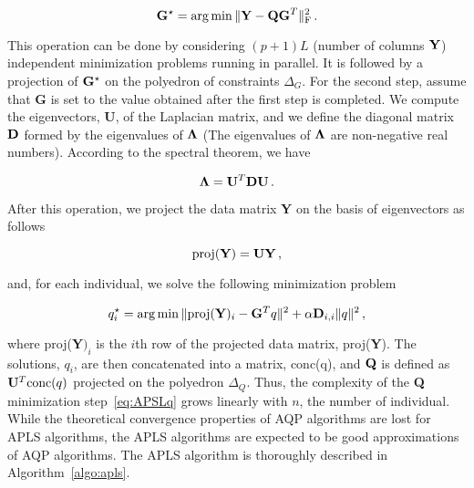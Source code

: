 \begin{equation}
{\bf G}^\star = \arg \min  \|  {\bf Y} - {\bf QG}^T \|^2_{\rm F} \, .
\end{equation}

This operation can be done by considering $(p+1)L$ (number of columns ${\bf Y}$) independent minimization problems running in parallel. It is followed by a projection of ${\bf G}^\star$ on the polyedron of constraints $\Delta_G$. For the second step, assume that {\bf G} is set to the value obtained after the first step is completed. We compute the eigenvectors, {\bf U}, of the Laplacian matrix, and we define the diagonal matrix ${\bf D}$ formed by the eigenvalues of ${\bf \Lambda}$ (The eigenvalues of ${\bf \Lambda}$ are non-negative real numbers). According to the spectral theorem, we have

$$
{\bf \Lambda} = {\bf U}^T {\bf D} {\bf U} \, .
$$

\noindent  After this operation, we project the data matrix {\bf Y} on the basis of eigenvectors as follows

$$
{\rm proj} ({\bf Y}) = {\bf U}{\bf Y} \, , 
$$

\noindent and, for each individual, we solve the following minimization problem

\begin{equation}
q_i^\star = \arg \min  \|  {\rm proj} ({\bf Y})_i  - {\bf G}^Tq \|^2 + \alpha {\bf D}_{i,i}   \| q \|^2  \, ,
\label{eq:APSLq}
\end{equation}

\noindent where  proj({\bf Y}$)_i$ is the $i$th row of the projected data matrix, proj({\bf Y}). The solutions, $q_i$, are then concatenated into a matrix, {\rm conc}(q), and ${\bf Q}$ is defined as ${\bf U}^T {\rm conc}(q)$ projected on the polyedron $\Delta_Q$. Thus, the complexity of the {\bf Q} minimization step~\eqref{eq:APSLq} grows linearly with $n$, the number of individual. While the theoretical convergence properties of AQP algorithms are lost for APLS algorithms, the APLS algorithms are expected to be good approximations of AQP algorithms. The APLS algorithm is thoroughly described in Algorithm~\ref{algo:apls}.


